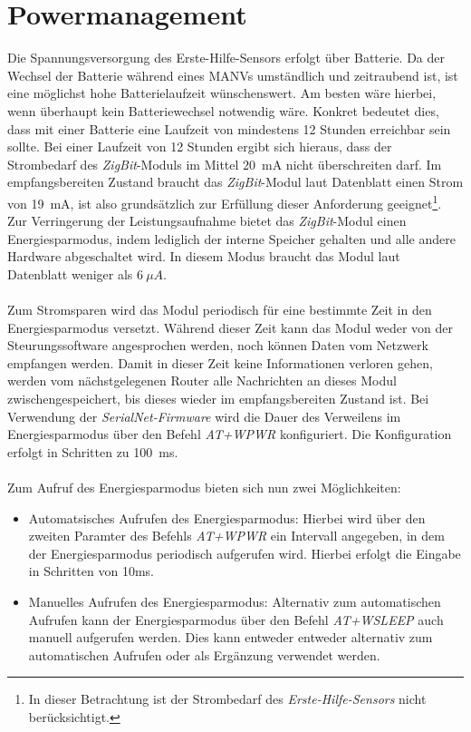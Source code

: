     \section{Powermanagement}\label{analyse_powermanagement}
        Die Spannungsversorgung des Erste-Hilfe-Sensors erfolgt über Batterie. Da der Wechsel der Batterie
        während eines MANVs umständlich und zeitraubend ist, ist eine möglichst hohe Batterielaufzeit
        wünschenswert. Am besten wäre hierbei, wenn überhaupt kein Batteriewechsel notwendig wäre. Konkret
        bedeutet dies, dass mit einer Batterie eine Laufzeit von mindestens 12 Stunden erreichbar sein sollte.
        Bei einer Laufzeit von 12 Stunden ergibt sich hieraus, dass der Strombedarf des \emph{ZigBit}-Moduls
        im Mittel 20~mA nicht überschreiten darf. Im empfangsbereiten Zustand braucht das \emph{ZigBit}-Modul 
        laut Datenblatt einen Strom von 19~mA, ist also grundsätzlich zur Erfüllung dieser Anforderung
        geeignet\footnote{In dieser Betrachtung ist der Strombedarf des \emph{Erste-Hilfe-Sensors} nicht berücksichtigt.}.
        Zur Verringerung der Leistungsaufnahme bietet das \emph{ZigBit}-Modul einen Energiesparmodus,
        indem lediglich der interne Speicher gehalten und alle andere Hardware abgeschaltet wird. In
        diesem Modus braucht das Modul laut Datenblatt weniger als $6~\mu{}A$.\\
        \\
        Zum Stromsparen wird das Modul periodisch für eine bestimmte Zeit in den
        Energiesparmodus versetzt. Während dieser Zeit kann das Modul weder von der Steurungssoftware angesprochen
        werden, noch können Daten vom Netzwerk empfangen werden. Damit in dieser Zeit keine Informationen
        verloren gehen, werden vom nächstgelegenen Router alle Nachrichten an dieses Modul zwischengespeichert,
        bis dieses wieder im empfangsbereiten Zustand ist. Bei Verwendung der \emph{SerialNet-Firmware} wird
        die Dauer des Verweilens im Energiesparmodus über den Befehl \emph{AT+WPWR} konfiguriert. Die Konfiguration
        erfolgt in Schritten zu 100~ms.\\
        \\
        Zum Aufruf des Energiesparmodus bieten sich nun zwei Möglichkeiten:

        \begin{itemize}
            \item{Automatsisches Aufrufen des Energiesparmodus:} Hierbei wird über den zweiten Paramter
            des Befehls \emph{AT+WPWR} ein Intervall angegeben, in dem der Energiesparmodus periodisch
            aufgerufen wird. Hierbei erfolgt die Eingabe in Schritten von 10ms.

            \item{Manuelles Aufrufen des Energiesparmodus:} Alternativ zum automatischen Aufrufen kann
            der Energiesparmodus über den Befehl \emph{AT+WSLEEP} auch manuell aufgerufen werden. Dies
            kann entweder entweder alternativ zum automatischen Aufrufen oder als Ergänzung verwendet
            werden.

        \end{itemize}

